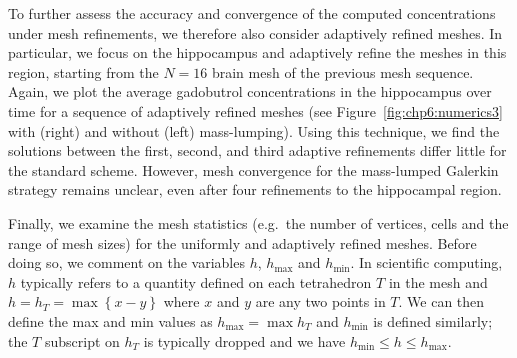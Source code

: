 To further assess the accuracy and convergence of the computed
concentrations under mesh refinements, we therefore also consider
adaptively refined meshes. In particular, we focus on the hippocampus
and adaptively refine the meshes in this region, starting from the
$N=16$ brain mesh of the previous mesh sequence. Again, we plot the
average gadobutrol concentrations in the hippocampus over time for
a sequence of adaptively refined meshes (see
Figure~\ref{fig:chp6:numerics3} with (right) and without (left)
mass-lumping). Using this technique, we find the solutions between the first, second,
and third adaptive refinements differ little for the standard
scheme. However, mesh convergence for the mass-lumped Galerkin
strategy remains unclear, even after four refinements to the
hippocampal region. 

Finally, we examine the mesh statistics (e.g.~the number of vertices,
cells and the range of mesh sizes) for the uniformly and adaptively
refined meshes. Before doing so, we comment on the variables $h$,
$h_{\text{max}}$ and $h_{\text{min}}$. In scientific computing, $h$
typically refers to a quantity defined on each tetrahedron $T$ in the
mesh and $h =h_T= \max\left\{x-y\right\}$ where $x$ and $y$ are any
two points in $T$. We can then define the max and min values as
$h_{\text{max}} = \max{h_T}$ and $h_{\text{min}}$ is defined
similarly; the $T$ subscript on $h_T$ is typically dropped and we have
$h_{\text{min}} \leq h \leq h_{\text{max}}$.

